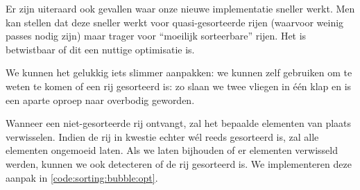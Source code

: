 Er zijn uiteraard ook gevallen waar onze nieuwe implementatie sneller werkt. Men kan stellen
dat deze sneller werkt voor quasi-gesorteerde rijen (waarvoor weinig passes nodig zijn)
maar trager voor ``moeilijk sorteerbare'' rijen. Het is betwistbaar of dit een nuttige optimisatie is.

We kunnen het gelukkig iets slimmer aanpakken: we kunnen 
zelf gebruiken om te weten te komen of een rij gesorteerd is: zo slaan
we twee vliegen in \'e\'en klap en is een aparte oproep naar  overbodig geworden.

Wanneer  een niet-gesorteerde rij ontvangt,
zal het bepaalde elementen van plaats verwisselen. Indien de rij in kwestie echter
w\'el reeds gesorteerd is, zal  alle elementen
ongemoeid laten. Als we  laten bijhouden of er elementen
verwisseld werden, kunnen we ook detecteren of de rij gesorteerd is. We implementeren
deze aanpak in \cref{code:sorting:bubble:opt}.


